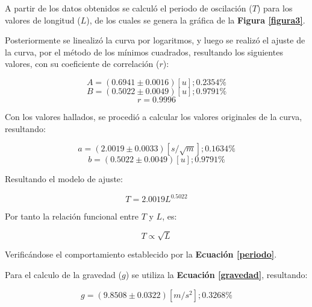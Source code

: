 \documentclass[letter,11pt]{article}
\begin{document}
A partir de los datos obtenidos se calculó el periodo de oscilación ($T$) para
los valores de longitud ($L$), de los cuales se genera la gráfica de la
\textbf{Figura \ref{figura3}}.

Posteriormente se linealizó la curva por logaritmos, y luego se realizó el ajuste
de la curva, por el método de los mínimos cuadrados, resultando los
siguientes valores, con su coeficiente de correlación ($r$):

\begin{equation*}
    A = (0.6941 \pm 0.0016) [u]; 0.2354 \%
\end{equation*}
\begin{equation*}
    B = (0.5022 \pm 0.0049) [u]; 0.9791 \%
\end{equation*}
\begin{equation*}
    r = 0.9996
\end{equation*}

Con los valores hallados, se procedió a calcular los valores originales
de la curva, resultando:

\begin{equation*}
    a = (2.0019 \pm 0.0033) [s/\sqrt{m}]; 0.1634 \%
\end{equation*}
\begin{equation*}
    b = (0.5022 \pm 0.0049) [u]; 0.9791 \%
\end{equation*}
\vspace{0.10cm}

Resultando el modelo de ajuste:

\begin{equation*}
    T = 2.0019 L^{0.5022}
\end{equation*}
\vspace{0.10cm}

Por tanto la relación funcional entre $T$ y $L$, es:

\begin{equation*}
    T \propto \sqrt{L}
\end{equation*}
\vspace{0.10cm}

Verificándose el comportamiento establecido por la
\textbf{Ecuación \ref{periodo}}.

Para el calculo de la gravedad ($g$) se utiliza la
\textbf{Ecuación \ref{gravedad}}, resultando:

\begin{equation*}
    g = (9.8508 \pm 0.0322) [m/s^2]; 0.3268 \%
\end{equation*}
\end{document}
